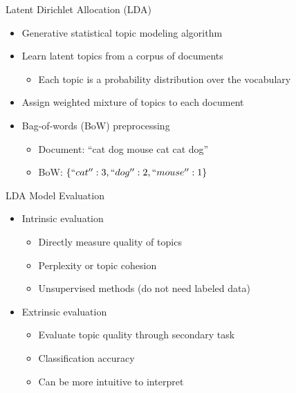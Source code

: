 \documentclass[handout,11pt]{beamer}
\begin{document}
	\begin{frame}{Latent Dirichlet Allocation (LDA)}
		\begin{itemize}
			\item Generative statistical topic modeling
				algorithm~\cite{bleiLatentDirichlet2003}
			\item Learn latent topics from a corpus of documents
				\begin{itemize}
					\item Each topic is a probability distribution over the vocabulary
				\end{itemize}
			\item Assign weighted mixture of topics to each document
			\item Bag-of-words (BoW) preprocessing
				\begin{itemize}
					\item Document: ``cat dog mouse cat cat dog''
					\item BoW\@: $\{``cat'': 3, ``dog'': 2, ``mouse'': 1\}$
				\end{itemize}
		\end{itemize}
	\end{frame}
	\begin{frame}{LDA Model Evaluation}
		\begin{itemize}
			\item Intrinsic evaluation
				\begin{itemize}
					\item Directly measure quality of topics
					\item Perplexity or topic cohesion
					\item Unsupervised methods (do not need labeled data)
				\end{itemize}
			\item Extrinsic evaluation
				\begin{itemize}
					\item Evaluate topic quality through secondary task
					\item Classification accuracy
					\item Can be more intuitive to interpret
				\end{itemize}
		\end{itemize}
	\end{frame}
\end{document}
